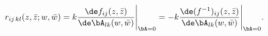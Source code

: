 \begin{equation}
r_{ij\,kl}(z,\bar{z};w,\bar{w})=
k\frac{\de f_{ij}(z,\bar{z})}{\de \bA_{lk}(w,\bar{w})}\Bigg|_{\bA=0}=
-k\frac{\de (f^{-1})_{ij}(z,\bar{z})}{\de \bA_{lk}(w,\bar{w})}\Bigg|_{\bA=0}.
\label{Green}
\end{equation}

